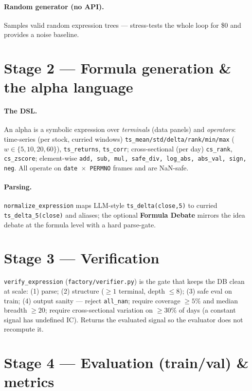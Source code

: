 \documentclass[11pt]{article}
\newcommand{\code}[1]{\texttt{#1}}
\newcommand{\file}[1]{\texttt{#1}}
\begin{document}
\paragraph{Random generator (no API).} Samples valid random expression trees ---
stress-tests the whole loop for \$0 and provides a noise baseline.

\section{Stage 2 --- Formula generation \& the alpha language}

\paragraph{The DSL.} An alpha is a symbolic expression over \emph{terminals} (data
panels) and \emph{operators}: time-series (per stock, curried windows)
\code{ts\_mean/std/delta/rank/min/max} ($w\in\{5,10,20,60\}$), \code{ts\_returns},
\code{ts\_corr}; cross-sectional (per day) \code{cs\_rank}, \code{cs\_zscore};
element-wise \code{add, sub, mul, safe\_div, log\_abs, abs\_val, sign, neg}. All
operate on \code{date $\times$ PERMNO} frames and are NaN-safe.

\paragraph{Parsing.} \code{normalize\_expression} maps LLM-style
\code{ts\_delta(close,5)} to curried \code{ts\_delta\_5(close)} and aliases; the
optional \textbf{Formula Debate} mirrors the idea debate at the formula level with a
hard parse-gate.

\section{Stage 3 --- Verification}

\code{verify\_expression} (\file{factory/verifier.py}) is the gate that keeps the DB
clean at scale: (1) parse; (2) structure ($\geq 1$ terminal, depth $\leq 8$);
(3) safe eval on train; (4) output sanity --- reject \code{all\_nan}; require
coverage $\geq 5\%$ and median breadth $\geq 20$; require cross-sectional variation on
$\geq 30\%$ of days (a constant signal has undefined IC). Returns the evaluated signal
so the evaluator does not recompute it.

\section{Stage 4 --- Evaluation (train/val) \& metrics}
\end{document}
